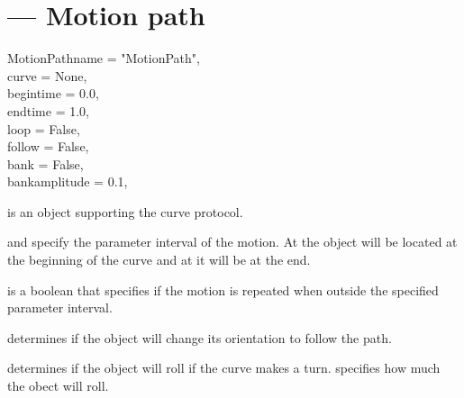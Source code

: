 
\section{ ---
         Motion path}

\begin{classdesc}{MotionPath}{name = "MotionPath",\\ 
                              curve = None,\\
                              begintime = 0.0,\\
                              endtime = 1.0,\\
                              loop = False,\\
                              follow = False,\\
                              bank = False,\\
                              bankamplitude = 0.1,\\
                             }

 is an object supporting the curve protocol.

 and  specify the parameter interval of
the motion. At  the object will be located at the beginning
of the curve and at  it will be at the end.

 is a boolean that specifies if the motion is repeated when 
outside the specified parameter interval.

 determines if the object will change its orientation to
follow the path.

 determines if the object will roll if the curve makes a turn.
 specifies how much the obect will roll.

\end{classdesc}


